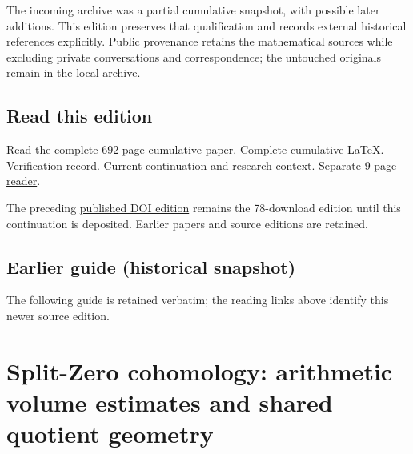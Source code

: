 \documentclass[
]{article}
\begin{document}
The incoming archive was a partial cumulative snapshot, with possible
later additions. This edition preserves that qualification and records
external historical references explicitly. Public provenance retains the
mathematical sources while excluding private conversations and
correspondence; the untouched originals remain in the local archive.

\subsection{Read this edition}\label{read-this-edition-4}

\href{https://github.com/KokunoYumeto/zeta-function-research-reader/blob/main/workbenches/splitzero-tandem/continuations/20260917-root-sensitive-growing-degree/15_CURRENT_MIXED_CONTROL_READER.pdf}{Read
the complete 692-page cumulative paper}.
\href{https://github.com/KokunoYumeto/zeta-function-research-reader/blob/main/workbenches/splitzero-tandem/continuations/20260917-root-sensitive-growing-degree/14_CURRENT_KERNEL_AND_MULTIPLICITY_PROOFS.tex}{Complete
cumulative LaTeX}.
\href{https://github.com/KokunoYumeto/zeta-function-research-reader/blob/main/workbenches/splitzero-tandem/continuations/20260917-root-sensitive-growing-degree/12_VALIDATION.md}{Verification
record}.
\href{https://github.com/KokunoYumeto/zeta-function-research-reader/blob/main/workbenches/splitzero-tandem/continuations/20260917-root-sensitive-growing-degree/00_CONTINUE_HERE.md}{Current
continuation and research context}.
\href{https://github.com/KokunoYumeto/zeta-function-research-reader/blob/main/workbenches/splitzero-tandem/continuations/20260917-root-sensitive-growing-degree/ROOT_SENSITIVE_GROWING_DEGREE_CORRECTED.pdf}{Separate
9-page reader}.

The preceding \href{https://zenodo.org/records/22802593}{published DOI
edition} remains the 78-download edition until this continuation is
deposited. Earlier papers and source editions are retained.

\subsection{Earlier guide (historical
snapshot)}\label{earlier-guide-historical-snapshot-8}

The following guide is retained verbatim; the reading links above
identify this newer source edition.

\section{Split-Zero cohomology: arithmetic volume estimates and shared
quotient
geometry}\label{split-zero-cohomology-arithmetic-volume-estimates-and-shared-quotient-geometry}
\end{document}
